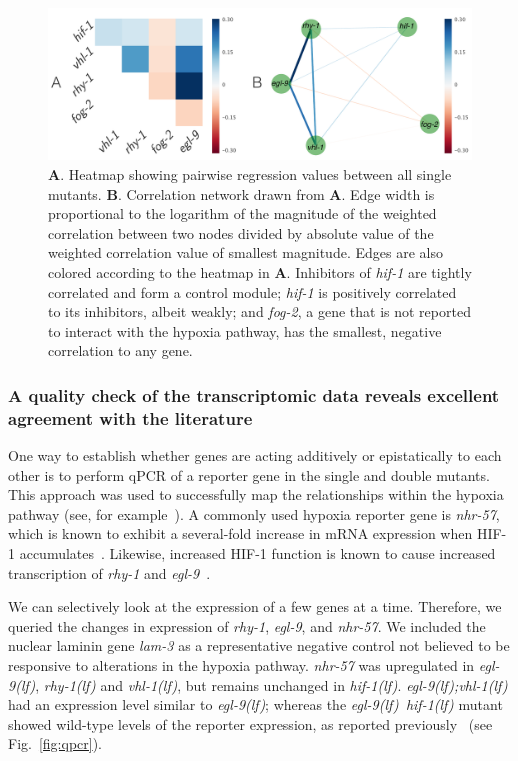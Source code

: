 \documentclass[10pt, onecolumn]{article}
\newcommand{\gene}[1]{\emph{#1}}
\newcommand{\nhr}{\emph{\mbox{nhr-57}}}
\newcommand{\lam}{\emph{\mbox{lam-3}}}
\newcommand{\egl}{\emph{\mbox{egl-9}(lf)}}
\newcommand{\rhy}{\emph{\mbox{rhy-1}(lf)}}
\newcommand{\vhl}{\emph{\mbox{vhl-1}(lf)}}
\newcommand{\eglvhl}{\emph{\mbox{egl-9(lf);vhl-1(lf)}}}
\newcommand{\eglhif}{\emph{\mbox{egl-9(lf)}~\mbox{hif-1(lf)}}}
\newcommand{\hif}{\emph{\mbox{hif-1(lf)}}}
\newcommand{\hifp}{HIF-1}
\begin{document}
\begin{figure}[tbhp]
\centering
\includegraphics[width=\linewidth]{../figs/bayesian-heatmap-horizontal.pdf}
\caption{
\textbf{A}. Heatmap showing pairwise regression values between all
single mutants. \textbf{B}. Correlation network drawn from \textbf{A}. Edge
width is proportional to the logarithm of the magnitude of the weighted
correlation between two nodes divided by absolute value of the weighted
correlation value of smallest magnitude. Edges are also colored according to the
heatmap in \textbf{A}. Inhibitors of \gene{hif-1} are tightly correlated and form
a control module;
\gene{hif-1} is positively correlated to its inhibitors, albeit weakly;
and
\gene{fog-2}, a gene that is not reported to interact with the hypoxia pathway,
has the smallest, negative correlation to any gene.
}
\label{fig:heatmap}
\end{figure}

\subsubsection*{A quality check of the transcriptomic data reveals excellent agreement
            with the literature}
\label{sub:quality_check}
One way to establish whether genes are acting additively or epistatically to each
other is to perform qPCR of a reporter gene in the single and double mutants. This
approach was used to successfully map the relationships within the hypoxia
pathway (see, for example~\cite{Shao2009,Shen2006}). A commonly used hypoxia reporter
gene is \nhr{}, which is known to exhibit a several-fold increase in mRNA
expression when \hifp{} accumulates~\cite{Shen2006,Shen2005,Park2012}. Likewise,
increased \hifp{} function is known to cause increased transcription of
\gene{rhy-1} and \gene{egl-9}~\cite{Powell-Coffman2010}.

We can
selectively look at the expression of a few genes at a time. Therefore, we
queried the changes in expression of \gene{rhy-1}, \gene{egl-9}, and \nhr{}. We
included the nuclear laminin gene \lam{} as a representative negative control not
believed to be responsive to alterations in the hypoxia pathway.
\nhr{} was upregulated in \egl{}, \rhy{} and \vhl{}, but remains unchanged in \hif{}.
\eglvhl{} had an expression level similar to \egl{}; whereas the
\eglhif{} mutant showed wild-type levels of the reporter expression, as reported
previously~\cite{Shen2006} (see Fig.~\ref{fig:qpcr}).
\end{document}
